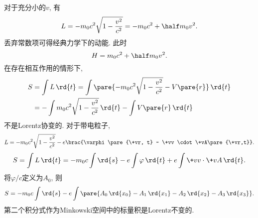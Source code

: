 \documentclass[../LectureNotes.tex]{subfiles}
\begin{document}
对于充分小的$v$, 有
\[ L = -m_0c^2 \sqrt{1-\frac{v^2}{c^2}} = -m_0c^2 + \half m_0v^2. \]
丢弃常数项可得经典力学下的动能. 此时
\[ H = m_0c^2 + \half m_0v^2. \]
在存在相互作用的情形下,
\begin{align*}
    S &= \int L\,\rd{t} = \int \pare{-m_0 c^2 \sqrt{1-\frac{v^2}{c^2}} - V\pare{r}}\,\rd{t} \\
    &= - \int m_0c^2\sqrt{1-\frac{v^2}{c^2}}\,\rd{t} - \int V\pare{r}\,\rd{t}
\end{align*}
不是Lorentz协变的. 对于带电粒子,
\[ L = -m_0c^2 \sqrt{1-\frac{v^2}{c^2}} - e\brac{\varphi\pare{\+vr, t} - \+vv \cdot\+vA\pare{\+vr,t}}. \]
\[ S = \int L\,\rd{t} = -m_0 c \int \rd{s} - e\int \varphi\,\rd{t} + e\int \+vv\cdot\+vA\,\rd{t}. \]
将$\varphi / c$定义为$A_0$, 则
\[ S = -m_0 c\int\rd{s} - e\int \pare{A_0\,\rd{x_0} - A_1\,\rd{x_1} - A_2\,\rd{x_2} - A_3\,\rd{x_3}}. \]
第二个积分式作为Minkowski空间中的标量积是Lorentz不变的.




\end{document}
